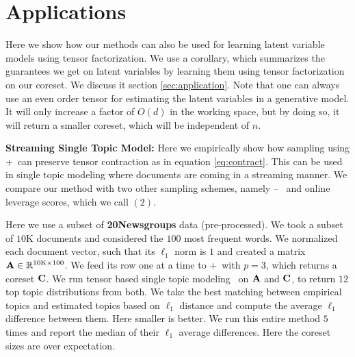 \section{Applications}\label{sec:topic}
Here we show how our methods can also be used for learning latent variable models using tensor factorization. We use a corollary, which summarizes the guarantees we get on latent variables by learning them using tensor factorization on our coreset. We discuss it section \ref{sec:application}.
Note that one can always use an even order tensor for estimating the latent variables in a generative model. It will only increase a factor of $O(d)$ in the working space, but by doing so, it will return a smaller coreset, which will be independent of $n$.
\par{\textbf{Streaming Single Topic Model:}}\label{exp}
Here we empirically show how sampling using \online+~can preserve tensor contraction as in equation \eqref{eq:contract}. This can be used in single topic modeling where documents are coming in a streaming manner. We compare our method with two other sampling schemes, namely -- \uni~and online leverage scores, which we call \online$(2)$.

Here we use a subset of \textbf{20Newsgroups} data (pre-processed). We took a subset of $10$K documents and considered the $100$ most frequent words. We normalized each document vector, such that its $\ell_{1}$ norm is $1$ and created a matrix $\mathbf{A} \in \mathbb{R}^{10\text{K} \times 100}$. We feed its row one at a time to \online+~with $p=3$, which returns a coreset $\mathbf{C}$. We run tensor based single topic modeling~\cite{anandkumar2014tensor} on $\mathbf{A}$ and $\mathbf{C}$, to return $12$ top topic distributions from both. We take the best matching between empirical topics and estimated topics based on $\ell_{1}$ distance and compute the average $\ell_{1}$ difference between them. Here smaller is better. We run this entire method $5$ times and report the median of their $\ell_{1}$ average differences. Here the coreset sizes are over expectation. 


